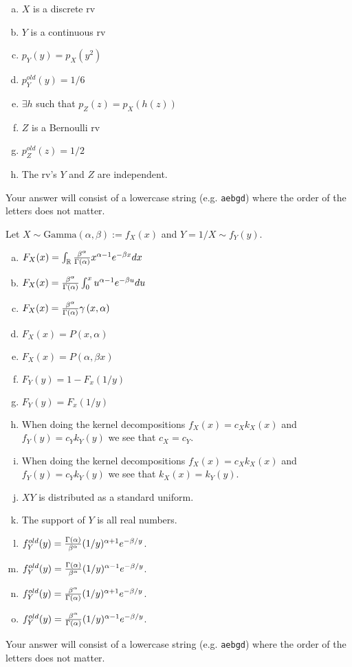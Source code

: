 \documentclass[12pt,landscape]{article}
\newcommand{\instr}{\small Your answer will consist of a lowercase string (e.g. \texttt{aebgd}) where the order of the letters does not matter. \normalsize}
\begin{document}
\vspace{-0.2cm}\benum{} 

\begin{enumerate}[(a)]
\item $X$ is a discrete rv
\item $Y$ is a continuous rv
\item $p_Y(y) = p_X(y^2)$
\item $p^{old}_Y(y) = 1/6$
\item $\exists h$ such that $p_Z(z) = p_X(h(z))$
\item $Z$ is a Bernoulli rv
\item $p^{old}_Z(z) = 1/2$
\item The rv's $Y$ and $Z$ are independent.
\end{enumerate}
\eenum\instr\pagebreak



\problem{} Let $X \sim \text{Gamma}(\alpha, \beta) := f_X(x)$ and $Y = 1/X \sim f_Y(y)$.

\vspace{-0.2cm}\benum{} 

\begin{enumerate}[(a)]
\item $F_X(x) = \int_{\mathbb{R}} \frac{\beta^\alpha}{\Gamma\left(\alpha\right)} x^{\alpha - 1} e^{-\beta x}dx$
\item $F_X(x) = \frac{\beta^\alpha}{\Gamma\left(\alpha\right)}  \int_0^{x} u^{\alpha - 1} e^{-\beta u}du$
\item $F_X(x) =  \frac{\beta^\alpha}{\Gamma\left(\alpha\right)} \gamma\left(x, \alpha\right)$
\item $F_X(x) =  P(x,\alpha)$
\item $F_X(x) =  P(\alpha,\beta x)$
\item $F_Y(y) =  1 - F_x(1/y)$
\item $F_Y(y) =  F_x(1/y)$
\item When doing the kernel decompositions $f_X(x) = c_X k_X(x)$ and $f_Y(y) = c_Y k_Y(y)$ we see that $c_X = c_Y$.
\item When doing the kernel decompositions $f_X(x) = c_X k_X(x)$ and $f_Y(y) = c_Y k_Y(y)$ we see that $k_X(x) = k_Y(y)$.
\item $XY$ is distributed as a standard uniform.
\item The support of $Y$ is all real numbers.
\item $f_Y^{old}(y) = \frac{\Gamma\left(\alpha\right)}{\beta^\alpha} (1/y)^{\alpha + 1} e^{-\beta / y}$.
\item $f_Y^{old}(y) = \frac{\Gamma\left(\alpha\right)}{\beta^\alpha} (1/y)^{\alpha - 1} e^{-\beta / y}$.
\item $f_Y^{old}(y) = \frac{\beta^\alpha}{\Gamma\left(\alpha\right)} (1/y)^{\alpha + 1} e^{-\beta / y}$.
\item $f_Y^{old}(y) = \frac{\beta^\alpha}{\Gamma\left(\alpha\right)} (1/y)^{\alpha - 1} e^{-\beta / y}$.

\end{enumerate}
\eenum\instr\pagebreak
\end{document}
